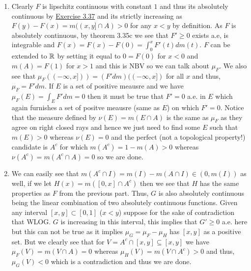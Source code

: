 \documentclass[12pt,a4paper]{article}
\begin{document}
\begin{solution}
\begin{enumerate}[label=\alph*.]
    \item Clearly $F$ is lipschitz continuous with constant $1$ and thus its absolutely continuous by \hyperref[prob:3-37]{Exercise 3.37} and its strictly increasing as $F(y)-F(x)=m((x,y]\cap A)>0$ for any $x<y$ by definition. 
        As $F$ is absolutely continuous, by theorem 3.35c we see that $F'\geq 0$ exists a.e, is integrable and $F(x)=F(x)-F(0)=\int_0^xF'(t)dm(t)$. 
       $F$ can be extended to $\mathbb{R}$ by setting it equal to $0=F(0)$ for $x<0$ and $m(A)=F(1)$ for $x>1$ and this is NBV so we can talk about $\mu_F.$ 
       We also see that $\mu_F((-\infty,x]))=(F'dm)((-\infty,x])$ for all $x$ and thus, $\mu_F=F'dm$. 
       If $E$ is a set of positive meausre and we have $\mu_F(E)=\int_EF'dm=0$ then it must be true that $F'=0$ a.e. in $E$ which again furnishes a set of positve meausre (same as $E$) on which $F'=0.$ 
       Notice that the measure defined by $\nu(E)=m(E\cap A)$ is the same as $\mu_F$ as they agree on right closed rays and hence we just need to find some $E$ such that $m(E)>0$ whereas $\nu(E)=0$ and the perfect (not a topological property!) candidate is $A^c$ for which $m(A^c)=1-m(A)>0$ whereas $\nu(A^c)=m(A^c\cap A)=0$ so we are done.
   \item We can easily see that $m(A^c\cap I)=m(I)-m(A\cap I)\in(0,m(I))$ as well, if we let $H(x)=m([0,x]\cap A^c)$ then we see that $H$ has the same properties as $F$ from the previous part. 
       Thus, $G$ is also absolutely continuous being the linear combination of two absolutely continuous functions. 
       Given any interval $[x,y]\subset[0,1]$ ($x<y$) suppose for the sake of contradiction that WLOG. $G$ is increasing in this interval, this implies that $G'\geq 0$ a.e. here but this can not be true as it implies $\mu_G=\mu_F-\mu_H$ has $[x,y]$ as a positive set. 
      But we clearly see that for $V=A^c\cap [x,y]\subseteq[x,y]$ we have $\mu_F(V)=m(V\cap A)=0$ whereas $\mu_H(V)=m(V\cap A^c)>0$ and thus, $\mu_G(V)<0$ which is a contradiction and thus we are done.
\end{enumerate}
\end{solution}
\end{document}
